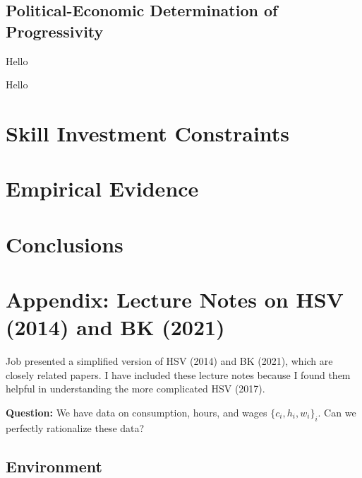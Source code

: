 \documentclass{article}
\begin{document}
\subsection{Political-Economic Determination of Progressivity}

{
\proposition Hello

}

{
\proposition Hello

}

\section{Skill Investment Constraints}

\section{Empirical Evidence}

\section{Conclusions}

\pagebreak

\section*{Appendix: Lecture Notes on HSV (2014) and BK (2021)}

Job presented a simplified version of HSV (2014) and BK (2021), which are closely related papers. I have included these lecture notes because I found them helpful in understanding the more complicated HSV (2017). 

\bigskip

\textbf{Question:} We have data on consumption, hours, and wages $\{c_i, h_i, w_i\}_i$. Can we perfectly rationalize these data?

\subsection*{Environment}
\end{document}
